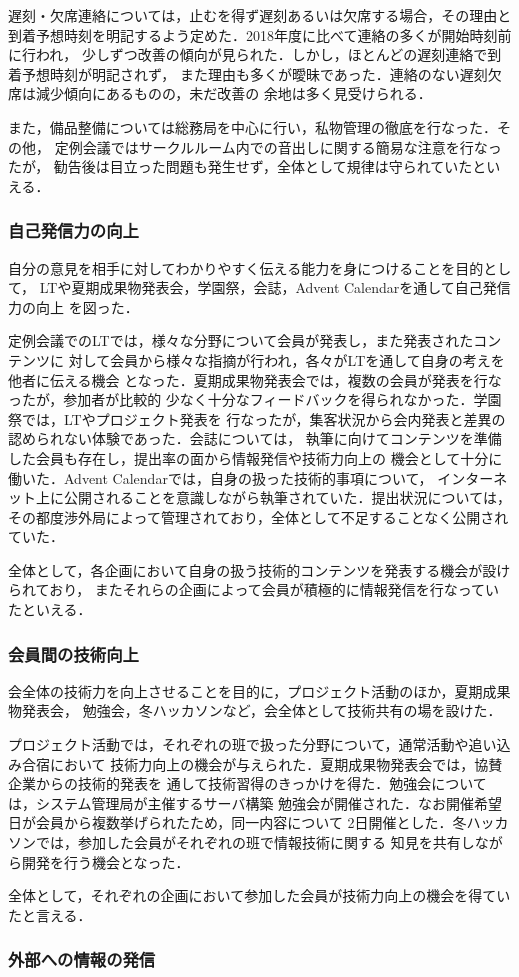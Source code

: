 遅刻・欠席連絡については，止むを得ず遅刻あるいは欠席する場合，その理由と
到着予想時刻を明記するよう定めた．2018年度に比べて連絡の多くが開始時刻前に行われ，
少しずつ改善の傾向が見られた．しかし，ほとんどの遅刻連絡で到着予想時刻が明記されず，
また理由も多くが曖昧であった．連絡のない遅刻欠席は減少傾向にあるものの，未だ改善の
余地は多く見受けられる．

また，備品整備については総務局を中心に行い，私物管理の徹底を行なった．その他，
定例会議ではサークルルーム内での音出しに関する簡易な注意を行なったが，
勧告後は目立った問題も発生せず，全体として規律は守られていたといえる．

\subsubsection*{自己発信力の向上}
自分の意見を相手に対してわかりやすく伝える能力を身につけることを目的として，
LTや夏期成果物発表会，学園祭，会誌，Advent Calendarを通して自己発信力の向上
を図った．

定例会議でのLTでは，様々な分野について会員が発表し，また発表されたコンテンツに
対して会員から様々な指摘が行われ，各々がLTを通して自身の考えを他者に伝える機会
となった．夏期成果物発表会では，複数の会員が発表を行なったが，参加者が比較的
少なく十分なフィードバックを得られなかった．学園祭では，LTやプロジェクト発表を
行なったが，集客状況から会内発表と差異の認められない体験であった．会誌については，
執筆に向けてコンテンツを準備した会員も存在し，提出率の面から情報発信や技術力向上の
機会として十分に働いた．Advent Calendarでは，自身の扱った技術的事項について，
インターネット上に公開されることを意識しながら執筆されていた．提出状況については，
その都度渉外局によって管理されており，全体として不足することなく公開されていた．

全体として，各企画において自身の扱う技術的コンテンツを発表する機会が設けられており，
またそれらの企画によって会員が積極的に情報発信を行なっていたといえる．

\subsubsection*{会員間の技術向上}
会全体の技術力を向上させることを目的に，プロジェクト活動のほか，夏期成果物発表会，
勉強会，冬ハッカソンなど，会全体として技術共有の場を設けた．

プロジェクト活動では，それぞれの班で扱った分野について，通常活動や追い込み合宿において
技術力向上の機会が与えられた．夏期成果物発表会では，協賛企業からの技術的発表を
通して技術習得のきっかけを得た．勉強会については，システム管理局が主催するサーバ構築
勉強会が開催された．なお開催希望日が会員から複数挙げられたため，同一内容について
2日開催とした．冬ハッカソンでは，参加した会員がそれぞれの班で情報技術に関する
知見を共有しながら開発を行う機会となった．

全体として，それぞれの企画において参加した会員が技術力向上の機会を得ていたと言える．

\subsubsection*{外部への情報の発信}

